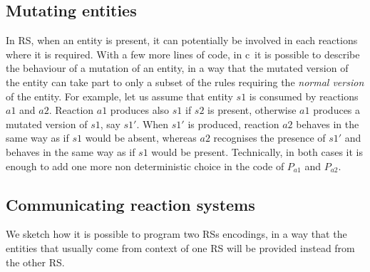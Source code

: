 \subsection{Mutating entities} 
In RS, when an entity is present, it can potentially be involved in each reactions where it is required.
With a few more lines of code, in c\CNA~it is possible to describe the behaviour of a mutation of 
an entity, in a way that the mutated version of the entity can take 
part to only a subset of the rules requiring  the  \emph{normal version} of the entity.
For example, let us assume that entity $s1$ is consumed by reactions $a1$ and $a2$.
Reaction $a1$ produces also $s1$ if $s2$ is present, otherwise $a1$ produces a mutated version of $s1$, 
say $s1'$.
When $s1'$ is produced, reaction $a2$ behaves in the same way as if $s1$ would be absent, whereas $a2$
recognises the presence of $s1'$ and behaves in the same way as if $s1$ would be present.
Technically, in both cases it is enough to add one more non 
deterministic choice in the code of $P_{a1}$ and $P_{a2}$. 


\subsection{Communicating reaction systems} 
We sketch how it is possible to program two RSs encodings, in a way that 
the entities that usually come from context of one RS will be provided instead from the other RS. 



